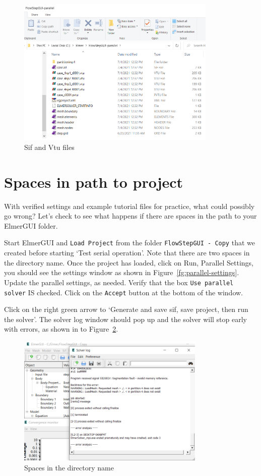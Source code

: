 \begin{figure}[H]
\centering
\includegraphics[width=0.85\textwidth]{parallel-11}
\caption{Sif and Vtu files}\label{fg:results-parallel}
\end{figure}

\section{Spaces in path to project}

With verified settings and example tutorial files for practice, what could possibly go wrong?  Let's check to see what happens if there are spaces in the path to your ElmerGUI folder.

Start ElmerGUI and \texttt{Load Project} from the folder \texttt{FlowStepGUI - Copy} that we created before starting `Test serial operation'.  Note that there are two spaces in the directory name.  Once the project has loaded, click on Run, Parallel Settings, you should see the settings window as shown in Figure~\ref{fg:parallel-settings}.  Update the parallel settings, as needed.  Verify that the box \texttt{Use parallel solver} IS checked.  Click on the \texttt{Accept} button at the bottom of the window.

Click on the right green arrow to `Generate and save sif, save project,  then run the solver'.  The solver log window  should pop up and the solver will stop early with errors, as shown in to Figure~\ref{fg:spaces}. 

\begin{figure}[H]
\centering
\includegraphics[width=0.8\textwidth]{parallel-12}
\caption{Spaces in the directory name}\label{fg:spaces}
\end{figure}

